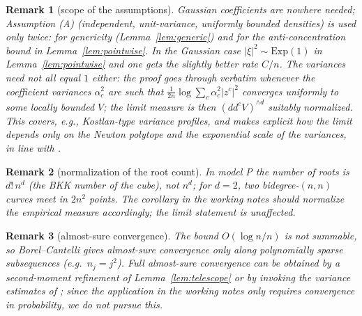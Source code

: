 \documentclass[12pt]{article}
\def\ddc{dd^c}
\newtheorem{remark}{Remark}[section]
\begin{document}
\begin{remark}[scope of the assumptions]
Gaussian coefficients are nowhere needed; Assumption (A) (independent, unit-variance,
uniformly bounded densities) is used only twice: for genericity
(Lemma~\ref{lem:generic}) and for the anti-concentration bound in
Lemma~\ref{lem:pointwise}. In the Gaussian case $|\xi|^2 \sim \mathrm{Exp}(1)$ in
Lemma~\ref{lem:pointwise} and one gets the slightly better rate $C/n$. The variances
need not all equal $1$ either: the proof goes through verbatim whenever the coefficient
variances $\alpha_c^2$ are such that $\frac{1}{2n}\log \sum_c \alpha_c^2 |z^c|^2$
converges uniformly to some locally bounded $V$; the limit measure is then
$(\ddc V)^{\wedge d}$ suitably normalized. This covers, e.g., Kostlan-type variance
profiles, and makes explicit how the limit depends only on the Newton polytope and the
exponential scale of the variances, in line with \cite{Bay16}.
\end{remark}

\begin{remark}[normalization of the root count]
In model P the number of roots is $d!\,n^d$ (the BKK number of the cube), not $n^d$; for
$d = 2$, two bidegree-$(n,n)$ curves meet in $2n^2$ points. The corollary in the working
notes should normalize the empirical measure accordingly; the limit statement is
unaffected.
\end{remark}

\begin{remark}[almost-sure convergence]
The bound $O(\log n / n)$ is not summable, so Borel--Cantelli gives almost-sure
convergence only along polynomially sparse subsequences (e.g.\ $n_j = j^2$). Full
almost-sure convergence can be obtained by a second-moment refinement of
Lemma~\ref{lem:telescope} or by invoking the variance estimates of \cite{BS07}; since
the application in the working notes only requires convergence in probability, we do not
pursue this.
\end{remark}
\end{document}
